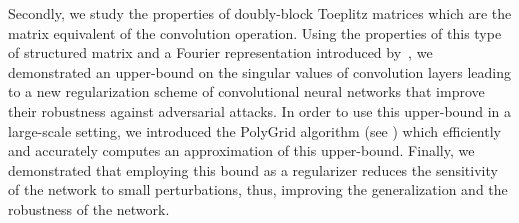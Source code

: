 
%

Secondly, we study the properties of doubly-block Toeplitz matrices which are the matrix equivalent of the convolution operation. 
Using the properties of this type of structured matrix and a Fourier representation introduced by~\citet{grenander1958toeplitz}, we demonstrated an upper-bound on the singular values of convolution layers leading to a new regularization scheme of convolutional neural networks that improve their robustness against adversarial attacks.
In order to use this upper-bound in a large-scale setting, we introduced the PolyGrid algorithm (see ) which efficiently and accurately computes an approximation of this upper-bound.
Finally, we demonstrated that employing this bound as a regularizer reduces the sensitivity of the network to small perturbations, thus, improving the generalization and the robustness of the network.






%
%




